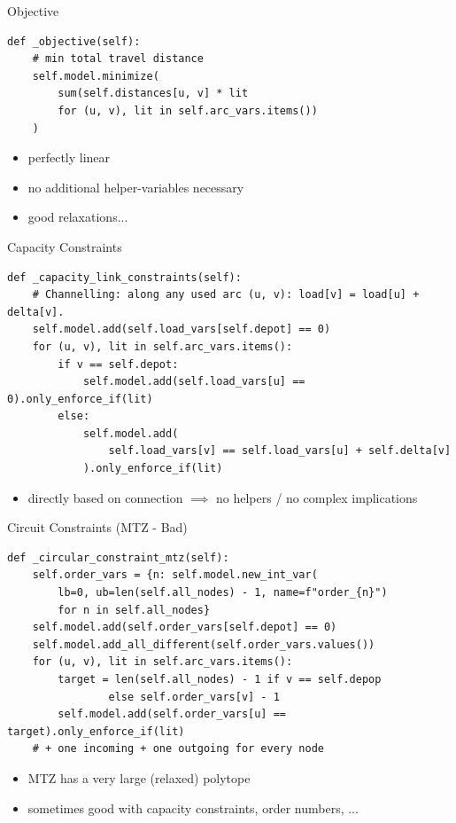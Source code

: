 \documentclass[fleqn,11pt,aspectratio=169]{beamer}
\begin{document}
\begin{frame}[fragile,t]{Objective}
	\begin{verbatim}
def _objective(self):
	# min total travel distance
	self.model.minimize(
		sum(self.distances[u, v] * lit 
		for (u, v), lit in self.arc_vars.items())
	)
	\end{verbatim}
	\begin{itemize}
		\item perfectly linear 
		\item no additional helper-variables necessary
		\item good relaxations...
	\end{itemize}
\end{frame}

\begin{frame}[fragile,t]{Capacity Constraints}
	\begin{verbatim}
def _capacity_link_constraints(self):
	# Channelling: along any used arc (u, v): load[v] = load[u] + delta[v].
	self.model.add(self.load_vars[self.depot] == 0)
	for (u, v), lit in self.arc_vars.items():
		if v == self.depot:
			self.model.add(self.load_vars[u] == 0).only_enforce_if(lit)
		else:
			self.model.add(
				self.load_vars[v] == self.load_vars[u] + self.delta[v]
			).only_enforce_if(lit)
	\end{verbatim}
	\begin{itemize}
		\item directly based on connection $\implies$ no helpers / no complex implications
	\end{itemize}
\end{frame}

\begin{frame}[fragile,t]{Circuit Constraints (MTZ - Bad)}
\begin{verbatim}
def _circular_constraint_mtz(self):
	self.order_vars = {n: self.model.new_int_var(
		lb=0, ub=len(self.all_nodes) - 1, name=f"order_{n}")
		for n in self.all_nodes}
	self.model.add(self.order_vars[self.depot] == 0)
	self.model.add_all_different(self.order_vars.values())
	for (u, v), lit in self.arc_vars.items():
		target = len(self.all_nodes) - 1 if v == self.depop
				else self.order_vars[v] - 1
		self.model.add(self.order_vars[u] == target).only_enforce_if(lit) 						
	# + one incoming + one outgoing for every node
\end{verbatim}
\begin{itemize}
	\item MTZ has a very large (relaxed) polytope
	\item sometimes good with capacity constraints, order numbers, ...
\end{itemize}
\end{frame}
\end{document}
